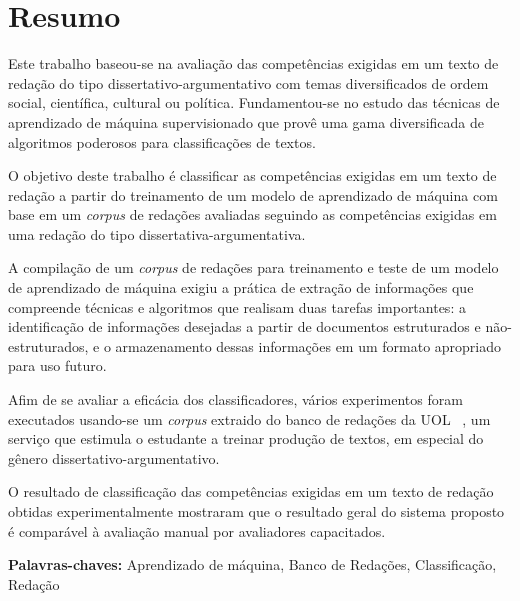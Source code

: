 \chapter*{Resumo}

\noindent Este trabalho baseou-se na avaliação das competências exigidas em um 
texto de redação do tipo dissertativo-argumentativo com temas diversificados 
de ordem social, científica, cultural ou política. Fundamentou-se no estudo 
das técnicas de aprendizado de máquina supervisionado que provê uma gama 
diversificada de algoritmos poderosos para classificações de textos.

O objetivo deste trabalho é classificar as competências exigidas em um texto de 
redação a partir do treinamento de um modelo de aprendizado de máquina com
base em um \textit{corpus} de redações avaliadas seguindo as competências 
exigidas em uma redação do tipo dissertativa-argumentativa.

A compilação de um \textit{corpus} de redações para treinamento e teste de um 
modelo de aprendizado de máquina exigiu a prática de extração de informações 
que compreende técnicas e algoritmos que realisam duas tarefas importantes: a 
identificação de informações desejadas a partir de documentos estruturados e 
não-estruturados, e o armazenamento dessas informações em um formato apropriado 
para uso futuro. 

Afim de se avaliar a eficácia dos classificadores, 
vários experimentos foram executados usando-se um \textit{corpus} extraido do 
banco de redações da UOL ~\cite{uol_banco_redacoes:2017}, um serviço que 
estimula o estudante a treinar produção de textos, em especial do gênero 
dissertativo-argumentativo. 

O resultado de classificação das competências exigidas em um texto de redação 
obtidas experimentalmente mostraram que o resultado geral do sistema proposto é 
comparável à avaliação manual por avaliadores capacitados.

\textbf{Palavras-chaves:} Aprendizado de máquina, Banco de Redações, Classificação,
Redação